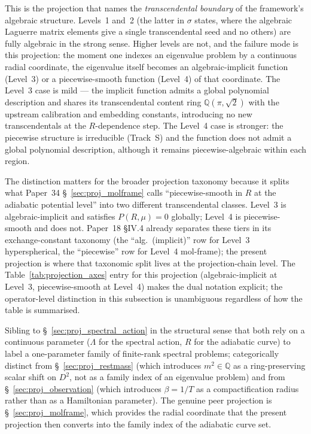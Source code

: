 \documentclass[11pt]{article}
\begin{document}
This is the projection that names the \emph{transcendental boundary}
of the framework's algebraic structure.  Levels~1 and~2 (the latter
in $\sigma$ states, where the algebraic Laguerre matrix elements give
a single transcendental seed and no others) are fully algebraic in
the strong sense.  Higher levels are not, and the failure mode is
this projection: the moment one indexes an eigenvalue problem by a
continuous radial coordinate, the eigenvalue itself becomes an
algebraic-implicit function (Level~3) or a piecewise-smooth function
(Level~4) of that coordinate.  The Level~3 case is mild --- the
implicit function admits a global polynomial description and shares
its transcendental content ring $\mathbb{Q}(\pi, \sqrt{2})$ with the
upstream calibration and embedding constants, introducing no new
transcendentals at the $R$-dependence step.  The Level~4 case is
stronger: the piecewise structure is irreducible (Track~S) and the
function does not admit a global polynomial description, although it
remains piecewise-algebraic within each region.

The distinction matters for the broader projection taxonomy because
it splits what Paper~34 \S~\ref{sec:proj_molframe} calls
``piecewise-smooth in $R$ at the adiabatic potential level'' into two
different transcendental classes.  Level~3 is algebraic-implicit and
satisfies $P(R, \mu) = 0$ globally; Level~4 is piecewise-smooth and
does not.  Paper~18 §IV.4 already separates these tiers in its
exchange-constant taxonomy (the ``alg.\ (implicit)'' row for Level~3
hyperspherical, the ``piecewise'' row for Level~4 mol-frame); the
present projection is where that taxonomic split lives at the
projection-chain level.  The Table~\ref{tab:projection_axes} entry for
this projection (algebraic-implicit at Level~3, piecewise-smooth at
Level~4) makes the dual notation explicit; the operator-level
distinction in this subsection is unambiguous regardless of how the
table is summarised.

Sibling to \S~\ref{sec:proj_spectral_action} in the structural sense
that both rely on a continuous parameter ($\Lambda$ for the spectral
action, $R$ for the adiabatic curve) to label a one-parameter family
of finite-rank spectral problems; categorically distinct from
\S~\ref{sec:proj_restmass} (which introduces $m^2 \in \mathbb{Q}$ as a
ring-preserving scalar shift on $D^2$, not as a family index of an
eigenvalue problem) and from \S~\ref{sec:proj_observation} (which
introduces $\beta = 1/T$ as a compactification radius rather than as
a Hamiltonian parameter).  The genuine peer projection is
\S~\ref{sec:proj_molframe}, which provides the radial coordinate that
the present projection then converts into the family index of the
adiabatic curve set.
\end{document}
